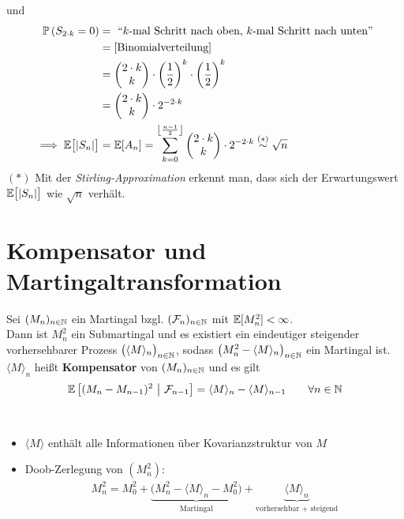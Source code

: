 \begin{beisp}
	und
	\begin{align*}
		\mathbb{P}\left(S_{2\cdot k}=0\right)&=\text{ ``$k$-mal Schritt nach oben, $k$-mal Schritt nach unten''}\\
		&=[\text{Binomialverteilung]}\\
		&=\begin{pmatrix}
			2\cdot k\\ k
		\end{pmatrix}\cdot\left(\frac{1}{2}\right)^k\cdot\left(\frac{1}{2}\right)^k\\
		&=\begin{pmatrix}
			2\cdot k \\ k
		\end{pmatrix}\cdot 2^{-2\cdot k}\\
		\implies
		\mathbb{E}\big[|S_n|\big]&=\mathbb{E}[A_n]=\sum\limits_{k=0}^{\left\lfloor\frac{n-1}{2}\right\rfloor}\begin{pmatrix}
			2\cdot k\\ k
		\end{pmatrix}\cdot 2^{-2\cdot k}\stackrel{(\ast)}{\sim}\sqrt{n}
	\end{align*}
	$(\ast)$ Mit der \textit{Stirling-Approximation} erkennt man, dass sich der Erwartungswert $\mathbb{E}\big[|S_n|\big]$ wie $\sqrt{n}$ verhält.
\end{beisp}

\section{Kompensator und Martingaltransformation} %
\setcounter{satz}{3}
\begin{lemma}\label{lemma2.4}
	Sei $(M_n)_{n\in\mathbb{N}}$ ein Martingal bzgl. $(\mathcal{F}_n)_{n\in\mathbb{N}}$ mit $\mathbb{E}[M_n^2]<\infty$.\\
	Dann ist $M_n^2$ ein Submartingal und es existiert ein eindeutiger steigender vorhersehbarer Prozess $\big(\langle M\rangle_n\big)_{n\in\mathbb{N}}$, sodass $\big(M_n^2-\langle M\rangle_n\big)_{n\in\mathbb{N}}$ ein Martingal ist.
	$\langle M\rangle_n$ heißt \textbf{Kompensator} von $(M_n)_{n\in\mathbb{N}}$ und es gilt
	\begin{align}\label{eqLemma2.4}
		\mathbb{E}\left[(M_n-M_{n-1})^2~\big|~\mathcal{F}_{n-1}\right]=\langle M\rangle_n-\langle M\rangle_{n-1}\qquad\forall n\in\mathbb{N}
	\end{align}
\end{lemma}

\begin{bemerkung}\ %
	\begin{itemize}
		\item $\langle M\rangle$ enthält alle Informationen über Kovarianzstruktur von $M$
		\item Doob-Zerlegung von $(M_n^2)$:
		\begin{align*}
			M_n^2=M_0^2+\underbrace{\big(M_n^2-\langle M\rangle_n-M_0^2\big)}_{\text{Martingal}}+\underbrace{\langle M\rangle_n}_{\text{vorhersehbar + steigend}}
		\end{align*}
	\end{itemize}
\end{bemerkung}

